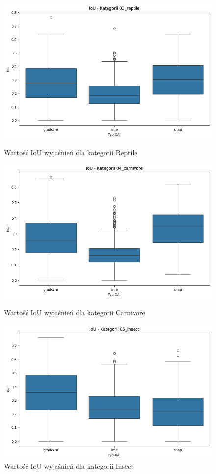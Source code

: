 \begin{figure}
	\centering
	\begin{minipage}[b]{0.3\textwidth}
		\centering\includegraphics[width=.9\textwidth]{img/base_iou_reptile}
		\caption{Wartość IoU wyjaśnień dla kategorii Reptile}  \label{rys:base_iou_reptile}
	\end{minipage}
	\begin{minipage}[b]{0.3\textwidth}
		\centering\includegraphics[width=.9\textwidth]{img/base_iou_carnivore}
		\caption{Wartość IoU wyjaśnień dla kategorii Carnivore}  \label{rys:base_iou_carnivore}
	\end{minipage}
	\begin{minipage}[b]{0.3\textwidth}
		\centering\includegraphics[width=.9\textwidth]{img/base_iou_insect}
		\caption{Wartość IoU wyjaśnień dla kategorii Insect}  \label{rys:base_iou_insect}
	\end{minipage}
\end{figure}
